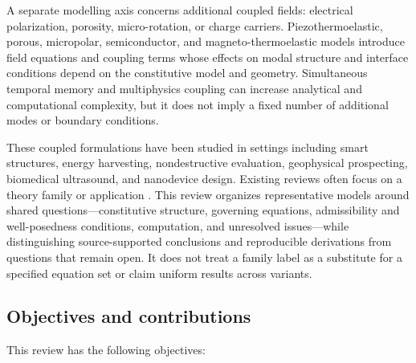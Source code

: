 A separate modelling axis concerns additional coupled fields: electrical polarization, porosity, micro-rotation, or charge carriers. Piezothermoelastic, porous, micropolar, semiconductor, and magneto-thermoelastic models introduce field equations and coupling terms whose effects on modal structure and interface conditions depend on the constitutive model and geometry. Simultaneous temporal memory and multiphysics coupling can increase analytical and computational complexity, but it does not imply a fixed number of additional modes or boundary conditions.

These coupled formulations have been studied in settings including smart structures, energy harvesting, nondestructive evaluation, geophysical prospecting, biomedical ultrasound, and nanodevice design. Existing reviews often focus on a theory family or application \cite{Shakeriaski2021,Chandrasekharaiah1998,Joseph1989,Askes2006}. This review organizes representative models around shared questions—constitutive structure, governing equations, admissibility and well-posedness conditions, computation, and unresolved issues—while distinguishing source-supported conclusions and reproducible derivations from questions that remain open. It does not treat a family label as a substitute for a specified equation set or claim uniform results across variants.

\subsection{Objectives and contributions}

This review has the following objectives:

